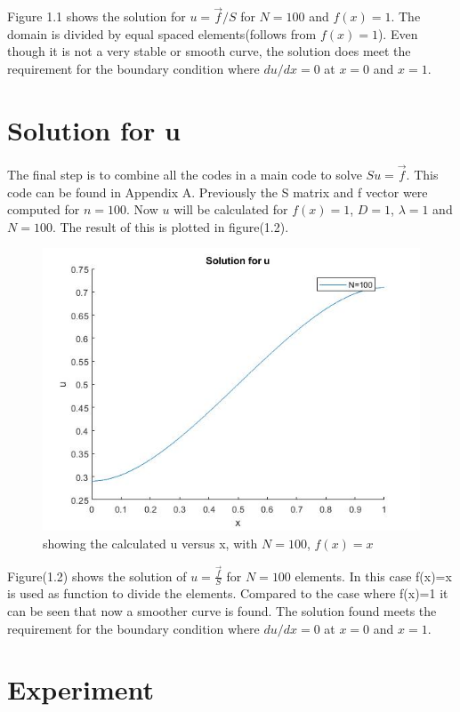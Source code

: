 \documentclass[a4paper]{report}
\begin{document}
Figure 1.1 shows the solution for $u=\vec{f}/S$ for $N=100$ and $f(x)=1$. The domain is divided by equal spaced elements(follows from $f(x)=1$). Even though it is not a very stable or smooth curve, the solution does meet the requirement for the boundary condition where $du/dx=0$ at $x=0$ and $x=1$.

\section{Solution for u}
The final step is to combine all the codes in a main code to solve $Su= \vec{f}$. This code can be found in Appendix A. Previously the S matrix and f vector were computed for $n = 100$. Now $u$ will be calculated for $f(x)=1$, $D=1$, $\lambda = 1$ and $N = 100$. The result of this is plotted in figure(1.2). 


\begin{figure}[ht!]
	\centering
	\includegraphics[width=140mm]{1Dfx.jpg}
	\caption{showing the calculated u versus x, with $N = 100$, $f(x)=x$		 \label{overflow}}
\end{figure}

Figure(1.2) shows the solution of $u=\frac{\vec{f}}{S}$ for $N=100$ elements. In this case f(x)=x is used as function to divide the elements. Compared to the case where f(x)=1 it can be seen that now a smoother curve is found. The solution found meets the requirement for the boundary condition where $du/dx=0$ at $x=0$ and $x=1$.

\vfill
\section{Experiment}
\end{document}
